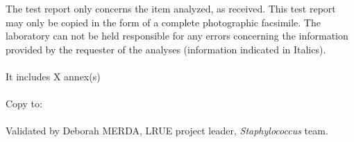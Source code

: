 \documentclass[a4paper]{article}
\begin{document}
\noindent
The test report only concerns the item analyzed, as received. This test report may only be copied in the form of a complete photographic facsimile. The laboratory can not be held responsible for any errors concerning the information provided by the requester of the analyses (information indicated in Italics). 
\\\\It includes X annex(s)\\\\%

\noindent
Copy to:
\noindent
\\\\Validated by Deborah MERDA, LRUE project leader, \textit{Staphylococcus} team.

 \label{LastPageOf}
\end{document}
